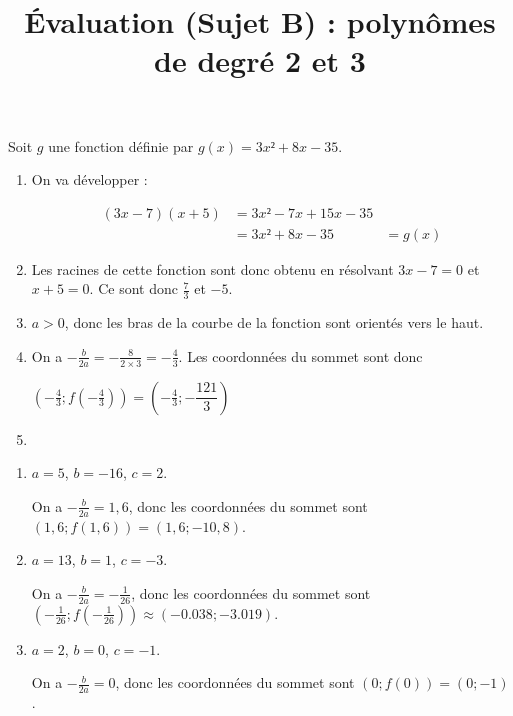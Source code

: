 \documentclass[
	classe=$1^{ere}STI2D$,
	headerTitle=Évaluation\space Chapitre\space 4
]{évaluation}
\begin{document}
\begin{exercice}
	Soit $g$ une fonction définie par $g(x) = 3x² + 8x - 35$.
	\begin{enumerate}
		\item On va développer :

		      \begin{align*}
			      (3x - 7)(x + 5) & = 3x² - 7x + 15x - 35 \\
			                      & = 3x² + 8x - 35
			                      & = g(x)
		      \end{align*}
		\item Les racines de cette fonction sont donc obtenu en résolvant $3x - 7 = 0$ et $x + 5 = 0$. Ce sont donc $\frac{7}{3}$ et $-5$.
		\item $a > 0$, donc les bras de la courbe de la fonction sont orientés vers le haut.
		\item On a $-\frac{b}{2a} = -\frac{8}{2×3} = -\frac{4}{3}$. Les coordonnées du sommet sont donc
		
		$(-\frac{4}{3} ; f(-\frac{4}{3})) = (-\frac{4}{3} ; -\dfrac{121}{3})$
		\item {}
	\end{enumerate}
\end{exercice}

\newpage
\setcounter{exercice}{1}

\title{Évaluation (Sujet B) : polynômes de degré 2 et 3}
\maketitle

\begin{exercice}
	\begin{enumerate}
		\item $a = 5$, $b = -16$, $c = 2$.

		      On a $-\frac{b}{2a} = 1,6$, donc les coordonnées du sommet sont $(1,6 ; f(1,6)) = (1,6; -10,8)$.
		\item $a = 13$, $b = 1$, $c = -3$.

		      On a $-\frac{b}{2a} = -\frac{1}{26}$, donc les coordonnées du sommet sont $(-\frac{1}{26} ; f(-\frac{1}{26})) ≈ (-0.038 ; -3.019)$.
		\item $a = 2$, $b = 0$, $c = -1$.

		      On a $-\frac{b}{2a} = 0$, donc les coordonnées du sommet sont $(0 ; f(0)) = (0 ; -1)$.
	\end{enumerate}
\end{exercice}
\end{document}
